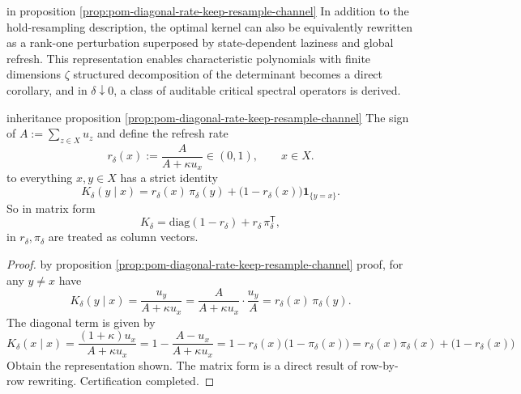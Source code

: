 
in proposition \ref{prop:pom-diagonal-rate-keep-resample-channel} In addition to the hold-resampling description, the optimal kernel can also be equivalently rewritten as a rank-one perturbation superposed by state-dependent laziness and global refresh.
This representation enables characteristic polynomials with finite dimensions \(\zeta\) structured decomposition of the determinant becomes a direct corollary, and in \(\delta\downarrow 0\), a class of auditable critical spectral operators is derived.

\begin{proposition}\label{prop:pom-diagonal-rate-rank-one-refresh-decomposition}
inheritance proposition \ref{prop:pom-diagonal-rate-keep-resample-channel} The sign of
\(
A:=\sum_{z\in X}u_z
\)
and define the refresh rate
\[
r_\delta(x):=\frac{A}{A+\kappa u_x}\in(0,1),\qquad x\in X.
\]
to everything \(x,y\in X\) has a strict identity
\[
K_\delta(y\mid x)
=r_\delta(x)\,\pi_\delta(y)+\bigl(1-r_\delta(x)\bigr)\mathbf 1_{\{y=x\}}.
\]
So in matrix form
\[
K_\delta=\mathrm{diag}(1-r_\delta)+r_\delta\,\pi_\delta^{\mathsf T},
\]
in \(r_\delta,\pi_\delta\) are treated as column vectors.
\end{proposition}
\begin{proof}
by proposition \ref{prop:pom-diagonal-rate-keep-resample-channel} proof, for any \(y\ne x\) have
\[
K_\delta(y\mid x)=\frac{u_y}{A+\kappa u_x}
=\frac{A}{A+\kappa u_x}\cdot \frac{u_y}{A}
=r_\delta(x)\,\pi_\delta(y).
\]
The diagonal term is given by
\[
K_\delta(x\mid x)=\frac{(1+\kappa)u_x}{A+\kappa u_x}
=1-\frac{A-u_x}{A+\kappa u_x}
=1-r_\delta(x)\bigl(1-\pi_\delta(x)\bigr)
=r_\delta(x)\pi_\delta(x)+\bigl(1-r_\delta(x)\bigr)
\]
Obtain the representation shown.
The matrix form is a direct result of row-by-row rewriting. Certification completed.
\end{proof}

